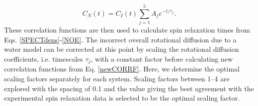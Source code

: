 \documentclass[journal=jpcbfk,manuscript=article]{achemso}
\begin{document}
\begin{equation}\label{newCORRF}
  C_N(t)=C_I(t)\sum_{j=1}^5 A_j e^{-t/\tau_j}.
\end{equation}
These correlation functions are then used to calculate spin relaxation times
from Eqs. \ref{SPECTdens}-\ref{NOE}. The incorrect overall rotational
diffusion due to a water model can be corrected at this point  by scaling the rotational diffusion
coefficients, i.e. timescales $\tau_j$, with a constant factor before calculating
new correlation functions from Eq. \ref{newCORRF}.
Here, we determine the optimal scaling factors separately for each system.
Scaling factors between 1--4 are explored with the spacing of 0.1 and
the value giving the best agreement with the experimental spin relaxation data
is selected to be the optimal scaling factor.
\end{document}
